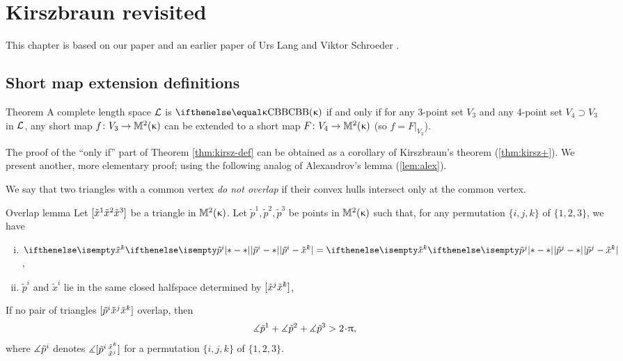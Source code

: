 \chapter{Kirszbraun revisited}

This chapter is based on our paper \cite{alexander-kapovitch-kirszbraun}
and an earlier paper of Urs Lang and  Viktor Schroeder
\cite{lang-schroeder}.


\section{Short map extension definitions}\label{sec:4pt}

\begin{thm}{Theorem}\label{thm:kirsz-def} 
A complete length space
$\mathcal{L}$ is $\Alex\kappa$ if and only if for any 3-point set $V_3$ and any 4-point set $V_4\supset V_3$ in $\mathcal{L}$, 
any short map $f\:V_3\to\Lob2\kappa$ can be extended to a short map $F\:V_4\to\Lob2\kappa$ (so $f=F|_{V_3}$).
\end{thm}

The proof of the ``only if'' part of Theorem \ref{thm:kirsz-def} can be obtained as a corollary of Kirszbraun's theorem (\ref{thm:kirsz+}).
We present another, more elementary proof; using the following analog of Alexandrov's lemma (\ref{lem:alex}).

We say that  two triangles with a common vertex \emph{do not overlap} if their convex hulls intersect only at the common vertex.


\begin{thm}{Overlap lemma}\label{lem:extend-overlap}
Let $[{\tilde x^1}{\tilde x^2}{\tilde x^3}]$ be a triangle in $\mathbb{M}_{{}}^{2}({\upkappa})$.  Let $\tilde p^1,\tilde p^2,\tilde p^3$ be points  in $\mathbb{M}_{{}}^{2}({\upkappa})$ such that, for any permutation $\{i,j,k\}$ of $\{1,2,3\}$, we have
\begin{enumerate}[(i)]

\item 
\label{no-overlap:px=px}
$\dist{\tilde p^i}{\tilde x^\kay}{}=\dist{\tilde p^j}{\tilde x^\kay}{}$,

\item
\label{no-overlap:orient-1}
$\tilde p^i$ and $\tilde x^i$ lie in the same closed halfspace determined by $[\tilde x^j\tilde x^\kay]$,  
\end{enumerate}

If no pair of triangles $\trig{\tilde p^i}{\tilde x^j}{\tilde x^\kay}$ overlap,
then 
\[\mangle{\tilde p^1} +\mangle {\tilde p^2}+\mangle{\tilde p^3}> 2\cdot\pi,\]
where $\measuredangle\tilde p^i$ denotes $\mangle\hinge{\tilde p^i}{\tilde x^\kay}{\tilde x^j}$
for a permutation $\{i,j,k\}$ of $\{1,2,3\}$.
\end{thm}

